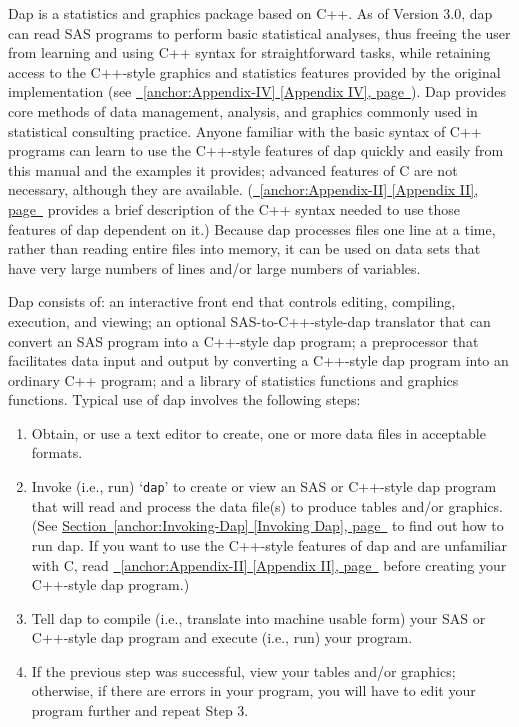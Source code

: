 \documentclass{book}
\renewcommand{\_}{\Texinfounderscore\discretionary{}{}{}}
\begin{document}
Dap is a statistics and graphics package based on C++.
As of Version 3.0, dap can read SAS programs to perform basic statistical
analyses, thus freeing the user from learning and using C++ syntax
for straightforward tasks,
while retaining access to the C++-style graphics and statistics
features provided by the original implementation (see \hyperref[anchor:Appendix-IV]{\chaptername~\ref*{anchor:Appendix-IV} [Appendix IV], page~\pageref*{anchor:Appendix-IV}}).
Dap provides core methods of data management,
analysis, and graphics commonly used in statistical
consulting practice.
Anyone familiar with the basic syntax of C++
%
%
programs can learn to use the C++-style features of
dap quickly and easily from this manual and the examples it provides;
advanced features of C are not necessary,
although they are available.
(\hyperref[anchor:Appendix-II]{\chaptername~\ref*{anchor:Appendix-II} [Appendix II], page~\pageref*{anchor:Appendix-II}} provides a brief description of the C++ syntax needed to use
those features of dap dependent on it.)
Because dap processes files one line at a time, rather than reading entire files
into memory, it can be used on data sets that have very large numbers of lines
and/or large numbers of variables.

Dap consists of: an interactive front end that
controls editing, compiling, execution, and viewing;
an optional SAS-to-C++-style-dap translator that can convert an SAS program into
a C++-style dap program;
a preprocessor that facilitates data input and output by
converting a C++-style dap program into an ordinary C++ program; and a library of
statistics functions and graphics functions.
Typical use of dap involves the following steps:

\begin{enumerate}[start=1]
\item Obtain, or use a text editor to create, one or more data files in acceptable
formats.
\item Invoke (i.e., run) `\texttt{dap}' to create or view an SAS or C++-style
dap program that will read and process the data file(s) to
produce tables and/or graphics.
(See \hyperref[anchor:Invoking-Dap]{Section~\ref*{anchor:Invoking-Dap} [Invoking Dap], page~\pageref*{anchor:Invoking-Dap}} to find out how to run dap.
If you want to use the C++-style features of dap and
are unfamiliar with C, read \hyperref[anchor:Appendix-II]{\chaptername~\ref*{anchor:Appendix-II} [Appendix II], page~\pageref*{anchor:Appendix-II}} before creating
your C++-style dap program.)
\item Tell dap to compile (i.e., translate into machine usable form) your SAS
or C++-style dap program and execute (i.e., run) your program.
\item If the previous step was successful, view your tables and/or
graphics; otherwise, if there are errors in your program, you will have to edit your program
further and repeat Step 3.
\end{enumerate}
\end{document}

